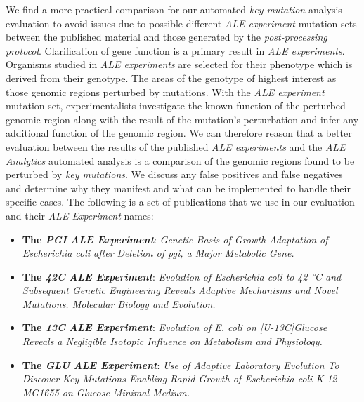 \documentclass[12pt,final,masters,chapterheads]{ucsd}  %
\begin{document}
%
%
We find a more practical comparison for our automated \textit{key mutation} analysis evaluation to avoid issues due to possible different \textit{ALE experiment} mutation sets between the published material and those generated by the \textit{post-processing protocol}. Clarification of gene function is a primary result in \textit{ALE experiments}. Organisms studied in \textit{ALE experiments} are selected for their phenotype which is derived from their genotype. The areas of the genotype of highest interest as those genomic regions perturbed by mutations. With the \textit{ALE experiment} mutation set, experimentalists investigate the known function of the perturbed genomic region along with the result of the mutation's perturbation and infer any additional function of the genomic region. We can therefore reason that a better evaluation between the results of the published \textit{ALE experiments} and the \textit{ALE Analytics} automated analysis is a comparison of the genomic regions found to be perturbed by \textit{key mutations}. We discuss any false positives and false negatives and determine why they manifest and what can be implemented to handle their specific cases. The following is a set of publications that we use in our evaluation and their \textit{ALE Experiment} names:
\begin{itemize}
\item \textbf{The \textit{PGI} \textit{ALE Experiment}}: \textit{Genetic Basis of Growth Adaptation of Escherichia coli after Deletion of pgi, a Major Metabolic Gene.} \cite{10.1371/journal.pgen.1001186}
\item \textbf{The \textit{42C} \textit{ALE Experiment}}: \textit{Evolution of Escherichia coli to 42 °C and Subsequent Genetic Engineering Reveals Adaptive Mechanisms and Novel Mutations. Molecular Biology and Evolution.} \cite{pmid25015645}
\item \textbf{The \textit{13C }\textit{ALE Experiment}}: \textit{Evolution of E. coli on [U-13C]Glucose Reveals a Negligible Isotopic Influence on Metabolism and Physiology.} \cite{pmid26964043}
\item \textbf{The \textit{GLU }\textit{ALE Experiment}}: \textit{Use of Adaptive Laboratory Evolution To Discover Key Mutations Enabling Rapid Growth of Escherichia coli K-12 MG1655 on Glucose Minimal Medium.} \cite{pmid25304508}
\end{itemize}
\end{document}
